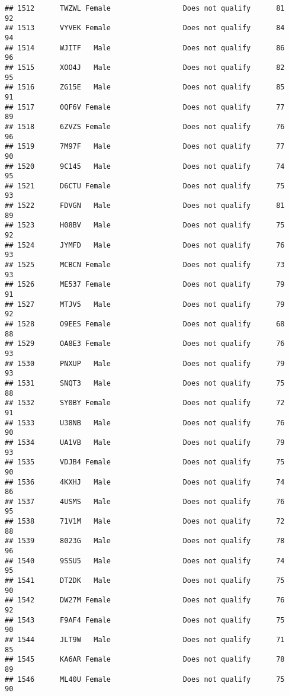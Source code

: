 \documentclass[
]{article}
\begin{document}
\begin{verbatim}
## 1512      TWZWL Female                 Does not qualify      81       92
## 1513      VYVEK Female                 Does not qualify      84       94
## 1514      WJITF   Male                 Does not qualify      86       96
## 1515      XOO4J   Male                 Does not qualify      82       95
## 1516      ZG15E   Male                 Does not qualify      85       91
## 1517      0QF6V Female                 Does not qualify      77       89
## 1518      6ZVZS Female                 Does not qualify      76       96
## 1519      7M97F   Male                 Does not qualify      77       90
## 1520      9C145   Male                 Does not qualify      74       95
## 1521      D6CTU Female                 Does not qualify      75       93
## 1522      FDVGN   Male                 Does not qualify      81       89
## 1523      H08BV   Male                 Does not qualify      75       92
## 1524      JYMFD   Male                 Does not qualify      76       93
## 1525      MCBCN Female                 Does not qualify      73       93
## 1526      ME537 Female                 Does not qualify      79       91
## 1527      MTJV5   Male                 Does not qualify      79       92
## 1528      O9EES Female                 Does not qualify      68       88
## 1529      OA8E3 Female                 Does not qualify      76       93
## 1530      PNXUP   Male                 Does not qualify      79       93
## 1531      SNQT3   Male                 Does not qualify      75       88
## 1532      SY0BY Female                 Does not qualify      72       91
## 1533      U38NB   Male                 Does not qualify      76       90
## 1534      UA1VB   Male                 Does not qualify      79       93
## 1535      VDJB4 Female                 Does not qualify      75       90
## 1536      4KXHJ   Male                 Does not qualify      74       86
## 1537      4USMS   Male                 Does not qualify      76       95
## 1538      71V1M   Male                 Does not qualify      72       88
## 1539      8023G   Male                 Does not qualify      78       96
## 1540      9SSU5   Male                 Does not qualify      74       95
## 1541      DT2DK   Male                 Does not qualify      75       90
## 1542      DW27M Female                 Does not qualify      76       92
## 1543      F9AF4 Female                 Does not qualify      75       90
## 1544      JLT9W   Male                 Does not qualify      71       85
## 1545      KA6AR Female                 Does not qualify      78       89
## 1546      ML40U Female                 Does not qualify      75       90

\end{verbatim}
\end{document}
